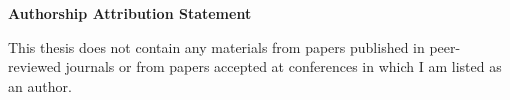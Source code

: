 \begin{titlepage}

\begin{center}
\Large{\bf{Authorship Attribution Statement}}
\end{center}

\vspace{0.2in}

\begin{spacing}{2}

This thesis does not contain any materials from papers published in peer-reviewed journals or from papers accepted at conferences in which I am listed as an author.

\end{spacing}

\vspace{6cm}

\begin{center}
	\makebox[4cm]{\dotfill}  \hfill \makebox[4cm]{\dotfill}\\
	      \hfill {}
\end{center}
\end{titlepage}
\newpage